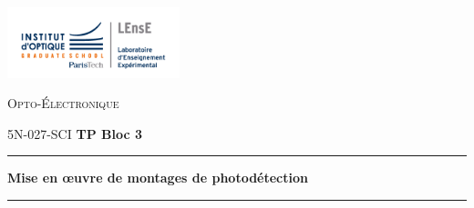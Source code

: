 \documentclass[a4paper,11pt]{article} %
\begin{document}
\begin{minipage}[c]{.25\linewidth}
	\includegraphics[width=5cm]{images/Logo-LEnsE.png}
\end{minipage} \hfill
\begin{minipage}[c]{.4\linewidth}

\begin{center}
\vspace{0.3cm}
{\Large \textsc{Opto-Électronique}}

\medskip

5N-027-SCI \qquad \textbf{\Large TP Bloc 3}

\end{center}
\end{minipage}\hfill

\vspace{0.5cm}

\noindent \rule{\linewidth}{1pt}

{\noindent\Large \rule[-7pt]{0pt}{30pt} \textbf{Mise en \oe{}uvre de montages de photodétection}}

\noindent \rule{\linewidth}{1pt}
\end{document}
